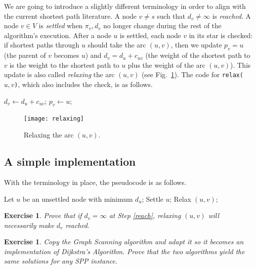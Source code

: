 \documentclass[a4paper]{book}
\theoremstyle{changebreak}                %
\newtheorem{ex}[result]{Exercise}
\begin{document}
We are going to introduce a slightly different terminology in order to
align with the current shortest path literature.  A node $v\not=s$
such that $d_v\not=\infty$ is {\it reached}. A
node $v\in V$ is {\it settled} when
$\pi_v,d_v$ no longer change during the rest of the algorithm's
execution. After a node $u$ is settled, each node $v$ in its star is
checked: if shortest paths through $u$ should take the arc $(u,v)$,
then we update $p_v=u$ (the parent of $v$ becomes $u$) and
$d_v=d_u+c_{uv}$ (the weight of the shortest path to $v$ is the weight
to the shortest path to $u$ plus the weight of the arc $(u,v)$). This
update is also called {\it relaxing} the arc $(u,v)$ (see
Fig.~\ref{f:relax}). The code for {\tt relax($u,v$)}, which also
includes the check, is as follows.
\begin{algorithmic}[1]
  \STATE $d_v\leftarrow d_u+c_{uv}$;
  \STATE $p_v\leftarrow u$;
\ENDIF
\end{algorithmic}
\begin{figure}[!ht]
\begin{center}
\texttt{[image: relaxing]}
\end{center}
\caption{Relaxing the arc $(u,v)$.}
\label{f:relax}
\end{figure}

\subsection{A simple implementation}
With the terminology in place, the pseudocode is as follows.
\begin{algorithmic}[1]
 \label{mainloop}
  \STATE Let $u$ be an unsettled node with minimum $d_u$; \label{minimum}
  \STATE Settle $u$; \label{settle}
   \label{reach}
    \STATE Relax $(u,v)$; \label{relax}
  \ENDFOR
\ENDWHILE
\end{algorithmic}

\begin{ex}
Prove that if $d_v=\infty$ at Step \ref{reach}, relaxing $(u,v)$ will
necessarily make $d_v$ reached.
\end{ex}

\begin{ex}
Copy the {\sc Graph Scanning} algorithm and adapt it so it becomes an
implementation of {\sc Dijkstra's Algorithm}. Prove that the two
algorithms yield the same solutions for any SPP
instance.
\end{ex}
\end{document}
